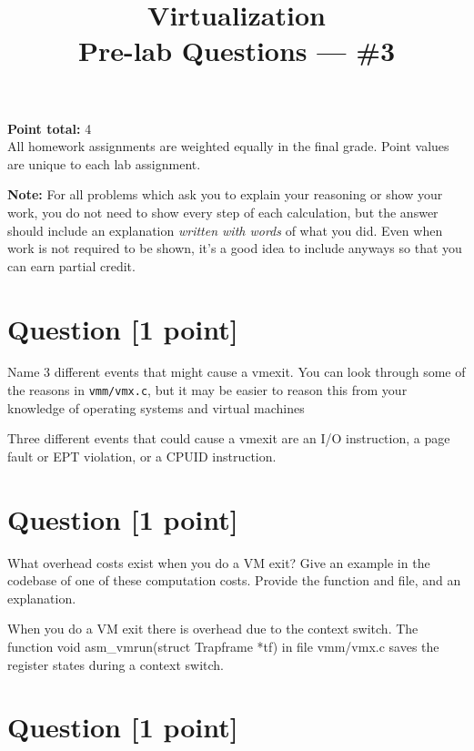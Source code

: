 \documentclass[11pt]{article}
\providecommand{\due}{}
\begin{document}
\title{Virtualization\\Pre-lab Questions --- \#3}
\date{\due}

\maketitle

\noindent \textbf{Point total:} 4
\\ All homework assignments are weighted equally in the final grade. Point values are unique to each lab assignment.

\textbf{Note:} For all problems which ask you to explain your reasoning or show your work, you do not need to show every step of each calculation, but the answer should include an explanation \emph{written with words} of what you did.  Even when work is not required to be shown, it’s a good idea to include anyways so that you can earn partial credit.

\section{Question [1 point]}

Name 3 different events that might cause a vmexit. You can look through some of the reasons in \texttt{vmm/vmx.c}, but it may be easier to reason this from your knowledge of operating systems and virtual machines

\begin{solution}
Three different events that could cause a vmexit are an I/O instruction, a page fault or EPT violation, or a CPUID instruction.
\end{solution}


\section{Question [1 point]}

What overhead costs exist when you do a VM exit? Give an example in the codebase of one of these computation costs. Provide the function and file, and an explanation.

\begin{solution}
When you do a VM exit there is overhead due to the context switch. The function void asm_vmrun(struct Trapframe *tf) in file vmm/vmx.c saves the register states during a context switch.
\end{solution}


\section{Question [1 point]}
\end{document}
